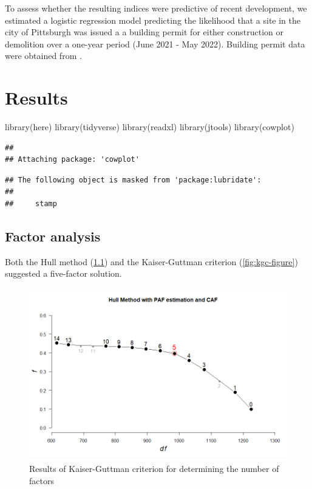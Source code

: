 \documentclass[
]{book}
\newenvironment{Shaded}{\begin{snugshade}}{\end{snugshade}}
\newcommand{\FunctionTok}[1]{\textcolor[rgb]{0.00,0.00,0.00}{#1}}
\newcommand{\NormalTok}[1]{#1}
\begin{document}
To assess whether the resulting indices were predictive of recent development, we
estimated a logistic regression model predicting the likelihood that a site in the
city of Pittsburgh was issued a a building permit for either construction or demolition
over a one-year period (June 2021 - May 2022). Building permit data were obtained
from \citet{western_pennsylvania_regional_data_center_permits_2022}.

\hypertarget{results}{%
\chapter{Results}\label{results}}

\begin{Shaded}
\begin{Highlighting}[]
\FunctionTok{library}\NormalTok{(here)}
\FunctionTok{library}\NormalTok{(tidyverse)}
\FunctionTok{library}\NormalTok{(readxl)}
\FunctionTok{library}\NormalTok{(jtools)}
\FunctionTok{library}\NormalTok{(cowplot)}
\end{Highlighting}
\end{Shaded}

\begin{verbatim}
## 
## Attaching package: 'cowplot'
\end{verbatim}

\begin{verbatim}
## The following object is masked from 'package:lubridate':
## 
##     stamp
\end{verbatim}

\hypertarget{factor-analysis}{%
\section{Factor analysis}\label{factor-analysis}}

Both the Hull method (\ref{fig:hull-figure}) and the Kaiser-Guttman
criterion (\ref{fig:kgc-figure}) suggested a five-factor solution.

\begin{figure}
\includegraphics[width=1\linewidth]{04_figures/hull-n-factors} \caption{Results of Kaiser-Guttman criterion for determining the number of factors}\label{fig:hull-figure}
\end{figure}
\end{document}
